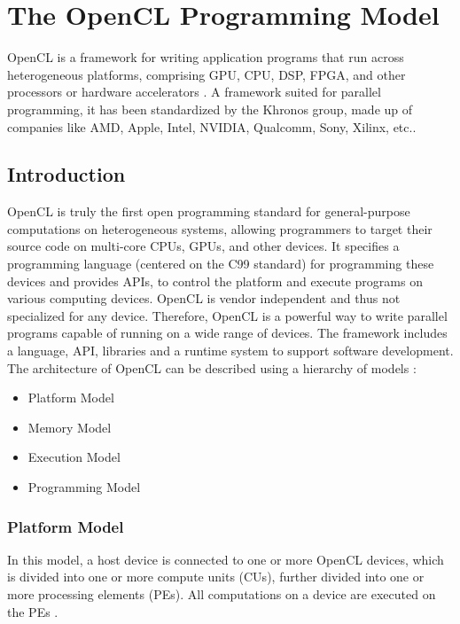 \chapter{The OpenCL Programming Model}
\label{ch4_opencl}

OpenCL is a framework for writing application programs that run across heterogeneous platforms, comprising \ac{GPU}, \ac{CPU}, \ac{DSP}, \ac{FPGA}, and other processors or hardware accelerators \cite{opencl_wiki}. A framework suited for parallel programming, it has been standardized by the Khronos group, made up of companies like AMD, Apple, Intel, NVIDIA, Qualcomm, Sony, Xilinx, etc.\cite{opencl_fixstars}.

\section{Introduction}

OpenCL is truly the first open programming standard for general-purpose computations on heterogeneous systems, allowing programmers to target their source code on multi-core CPUs, GPUs, and other devices. It specifies a programming language (centered on the C99 standard) for programming these devices and provides \ac{API}s, to control the platform and execute programs on various computing devices. OpenCL is vendor independent and thus not specialized for any device. Therefore, OpenCL is a powerful way to write parallel programs capable of running on a wide range of devices. \newline\newline
The framework includes a language, API, libraries and a runtime system to support software development. The architecture of OpenCL can be described using a hierarchy of models \cite{opencl_ajg}:

\begin{itemize}
\item Platform Model
\item Memory Model
\item Execution Model
\item Programming Model
\end{itemize}

\subsection{Platform Model}
In this model, a host device is connected to one or more OpenCL devices, which is divided into one or more compute units (CUs), further divided into one or more processing elements (PEs). All computations on a device are executed on the PEs \cite{opencl_khronos}.

